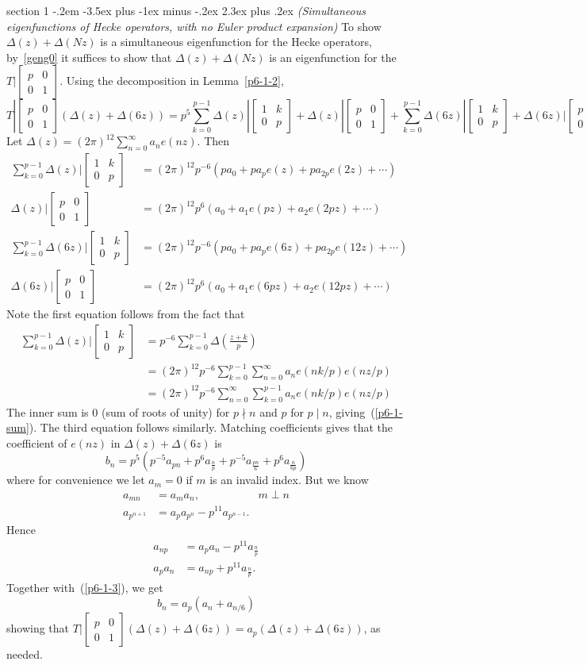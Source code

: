 \documentclass[12pt]{article}
\makeatletter
\theoremstyle{norm}
\newcommand{\De}[0]{\Delta}
\newcommand{\pa}[1]{\left( {#1} \right)}
\newcommand{\pf}[2]{\pa{\frac{#1}{#2}}}
\newcommand{\matt}[4]{
\left[
\begin{matrix}
{#1}&{#2}\\
{#3}&{#4}
\end{matrix}
\right]}
\newcommand{\smatt}[4]{
\left[
\begin{smallmatrix}
{#1}&{#2}\\
{#3}&{#4}
\end{smallmatrix}
\right]}
\newcommand{\iy}[0]{\infty}
\newenvironment{problem}{\@startsection
       {section}
       {1}
       {-.2em}
       {-3.5ex plus -1ex minus -.2ex}
       {2.3ex plus .2ex}
       {\pagebreak[3]%
       \large\bf\noindent{Problem }
       }
       }
       {%
       }
\makeatother
\begin{document}
\begin{problem}{\it (Simultaneous eigenfunctions of Hecke operators, with no Euler product expansion)}
To show $\De(z)+\De(Nz)$ is a simultaneous eigenfunction for the Hecke operators, by~\ref{geng0} it suffices to show that $\De(z)+\De(Nz)$ is an eigenfunction for the $T|\smatt p001$. %
Using the decomposition in Lemma~\ref{p6-1-2},
\[
T|\matt p001(\De(z)+\De(6z))=p^{5}\sum_{k=0}^{p-1} \De(z)|\matt 1k0p+\De(z)|\matt p001+\sum_{k=0}^{p-1} \De(6z)|\matt 1k0p+\De(6z)|\matt p001.
\]
Let $\De(z)=(2\pi)^{12}\sum_{n=0}^{\iy}a_ne(nz)$. Then
\begin{align}
\label{p6-1-sum}
\sum_{k=0}^{p-1} \De(z)|\matt 1k0p
&=(2\pi)^{12}p^{-6}(pa_0+pa_pe(z)+pa_{2p}e(2z)+\cdots )\\
\nonumber
\De(z)|\matt p001
&=(2\pi)^{12}p^{6}(a_0+a_1e(pz)+a_2e(2pz)+\cdots)\\
\nonumber
\sum_{k=0}^{p-1} \De(6z)|\matt 1k0p
&=(2\pi)^{12}p^{-6}(pa_0+pa_pe(6z)+pa_{2p}e(12z)+\cdots )\\
\nonumber
\De(6z)|\matt p001
&=(2\pi)^{12}p^{6}(a_0+a_1e(6pz)+a_2e(12pz)+\cdots)
\end{align}
Note the first equation follows from the fact that 
\begin{align*}
\sum_{k=0}^{p-1}\De(z)|\matt 1k0p&=p^{-6}\sum_{k=0}^{p-1} \De\pf{z+k}{p}\\
&=(2\pi)^{12}p^{-6}\sum_{k=0}^{p-1} \sum_{n=0}^{\iy} a_n e(nk/p)e(nz/p)\\
&=(2\pi)^{12}p^{-6} \sum_{n=0}^{\iy} \sum_{k=0}^{p-1}a_n e(nk/p)e(nz/p)
\end{align*}
The inner sum is 0 (sum of roots of unity) for $p\nmid n$ and $p$ for $p\mid n$, giving~(\ref{p6-1-sum}). The third equation follows similarly. Matching coefficients gives that the coefficient of $e(nz)$ in $\De(z)+\De(6z)$ is
\begin{equation}\label{p6-1-3}
b_n=p^{5}(p^{-5}a_{pn}+p^6a_{\frac np}+p^{-5}a_{\frac{pn}6}+p^6a_{\frac n{6p}})
\end{equation}
where for convenience we let $a_m=0$ if $m$ is an invalid index.
But we know
\begin{align*}
a_{mn}&=a_ma_n,&m\perp n\\
a_{p^{n+1}}&=a_pa_{p^n}-p^{11}a_{p^{n-1}}.
\end{align*}
Hence
\begin{align*}
a_{np}&=a_pa_n-p^{11}a_{\frac np}\\
a_pa_n&=a_{np}+p^{11}a_{\frac np}.
\end{align*}
Together with~(\ref{p6-1-3}), we get
\[
b_n={a_p}(a_n+a_{n/6})
\]
showing that $T|\smatt p001(\De(z)+\De(6z))={a_p}(\De(z)+\De(6z))$, as needed.\\


\end{problem}
\end{document}
